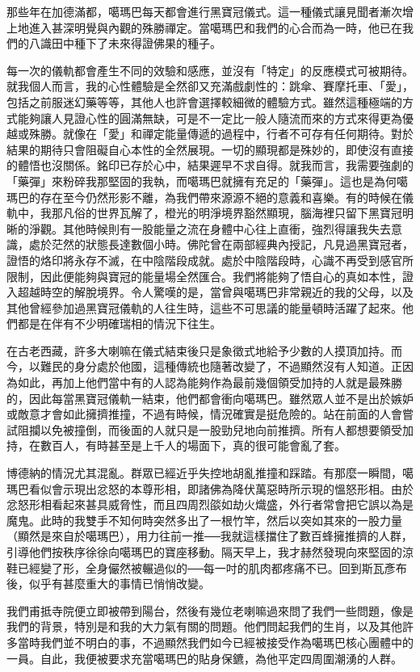 那些年在加德滿都，噶瑪巴每天都會進行黑寶冠儀式。這一種儀式讓見聞者漸次增上地進入甚深明覺與內觀的殊勝禪定。當噶瑪巴和我們的心合而為一時，他已在我們的八識田中種下了未來得證佛果的種子。

每一次的儀軌都會產生不同的效驗和感應，並沒有「特定」的反應模式可被期待。就我個人而言，我的心性體驗是全然卻又充滿戲劇性的：跳傘、賽摩托車、「愛」，包括之前服迷幻藥等等，其他人也許會選擇較細微的體驗方式。雖然這種極端的方式能夠讓人見證心性的圓滿無缺，可是不一定比一般人隨流而來的方式來得更為優越或殊勝。就像在「愛」和禪定能量傳遞的過程中，行者不可存有任何期待。對於結果的期待只會阻礙自心本性的全然展現。一切的顯現都是殊妙的，即使沒有直接的體悟也沒關係。銘印已存於心中，結果遲早不求自得。就我而言，我需要強劇的「藥彈」來粉碎我那堅固的我執，而噶瑪巴就擁有充足的「藥彈」。這也是為何噶瑪巴的存在至今仍然形影不離，為我們帶來源源不絕的意義和喜樂。有的時候在儀軌中，我那凡俗的世界瓦解了，橙光的明淨境界豁然顯現，腦海裡只留下黑寶冠明晰的淨觀。其他時候則有一股能量之流在身體中心往上直衝，強烈得讓我失去意識，處於茫然的狀態長達數個小時。佛陀曾在兩部經典內授記，凡見過黑寶冠者，證悟的烙印將永存不滅，在中陰階段成就。處於中陰階段時，心識不再受到感官所限制，因此便能夠與寶冠的能量場全然匯合。我們將能夠了悟自心的真如本性，證入超越時空的解脫境界。令人驚嘆的是，當曾與噶瑪巴非常親近的我的父母，以及其他曾經參加過黑寶冠儀軌的人往生時，這些不可思議的能量頓時活躍了起來。他們都是在伴有不少明確瑞相的情況下往生。

在古老西藏，許多大喇嘛在儀式結束後只是象徵式地給予少數的人摸頂加持。而今，以難民的身分處於他國，這種傳統也隨著改變了，不過顯然沒有人知道。正因為如此，再加上他們當中有的人認為能夠作為最前幾個領受加持的人就是最殊勝的，因此每當黑寶冠儀軌一結束，他們都會衝向噶瑪巴。雖然眾人並不是出於嫉妒或敵意才會如此擁擠推撞，不過有時候，情況確實是挺危險的。站在前面的人會嘗試阻攔以免被撞倒，而後面的人就只是一股勁兒地向前推擠。所有人都想要領受加持，在數百人，有時甚至是上千人的場面下，真的很可能會亂了套。

博德納的情況尤其混亂。群眾已經近乎失控地胡亂推撞和踩踏。有那麼一瞬間，噶瑪巴看似會示現出忿怒的本尊形相，即諸佛為降伏萬惡時所示現的慍怒形相。由於忿怒形相看起來甚具威脅性，而且四周烈燄如劫火熾盛，外行者常會把它誤以為是魔鬼。此時的我雙手不知何時突然多出了一根竹竿，然后以突如其來的一股力量（顯然是來自於噶瑪巴），用力往前一推──我就這樣擋住了數百蜂擁推擠的人群，引導他們按秩序徐徐向噶瑪巴的寶座移動。隔天早上，我才赫然發現向來堅固的涼鞋已經變了形，全身儼然被輾過似的──每一吋的肌肉都疼痛不已。回到斯瓦彥布後，似乎有甚麼重大的事情已悄悄改變。

我們甫抵寺院便立即被帶到陽台，然後有幾位老喇嘛過來問了我們一些問題，像是我們的背景，特別是和我的大力氣有關的問題。他們問起我們的生肖，以及其他許多當時我們並不明白的事，不過顯然我們如今已經被接受作為噶瑪巴核心團體中的一員。自此，我便被要求充當噶瑪巴的貼身保鑣，為他平定四周圍潮湧的人群。　

